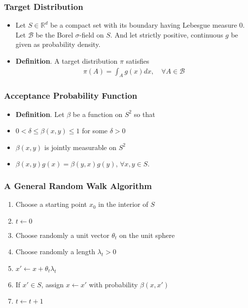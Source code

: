 \documentclass{beamer}
\begin{document}

\begin{frame}
	\frametitle{Target Distribution}
	\begin{itemize}
	\item Let \(S \in \mathbb{R}^d\) be a compact set with its boundary having Lebesgue measure 0.
	Let \(\mathcal{B}\) be the Borel \(\sigma\)-field on \(S\).
	And let strictly positive, continuous \(g\) be given as probability density.
	\item \textbf{Definition}. A target distribution \(\pi\) satisfies
	\begin{gather*}
	\pi(A)
	=\int_A g(x) dx,
	\quad \forall A \in \mathcal{B}
	\end{gather*}
	\end{itemize}
\end{frame}


\begin{frame}
	\frametitle{Acceptance Probability Function}
	\begin{itemize}
	\item \textbf{Definition}. Let \(\beta\) be a function on \(S^2\) so that
	\item \(0 <\delta \leq \beta(x,y) \leq 1\) for some \(\delta >0\)
	\item \(\beta(x,y)\) is jointly measurable on \(S^2\)
	\item \(\beta(x,y) g(x) =\beta(y,x) g(y)\), \(\forall x,y \in S\).
	\end{itemize}
\end{frame}


\begin{frame}
	\frametitle{A General Random Walk Algorithm}
	\begin{enumerate}
    \item Choose a starting point \(x_0\)	in the interior of \(S\)
    \item \(t \leftarrow 0\)
    \item Choose randomly a unit vector \(\theta_t\) on the unit sphere
    \item Choose randomly a length \(\lambda_t >0\)
    \item \(x' \leftarrow x +\theta_t \lambda_t\)
    \item If \(x' \in S\), assign \(x \leftarrow x'\) with probability \(\beta(x,x')\)
    \item \(t \leftarrow t+1\)
	\end{enumerate}
\end{frame}
\end{document}
